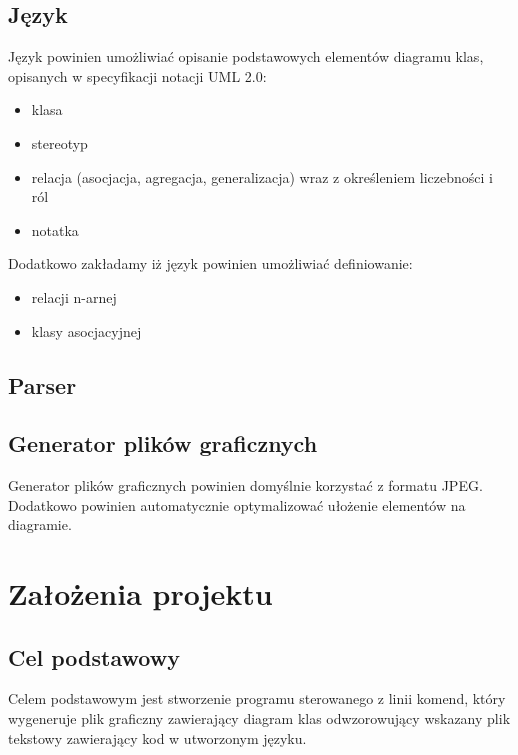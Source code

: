 \documentclass[a4paper,11pt,notitlepage]{article}
\begin{document}
\subsection{Język}
Język powinien umożliwiać opisanie podstawowych elementów diagramu klas, opisanych w specyfikacji notacji UML 2.0:
\begin{itemize}
\item{klasa}
\item{stereotyp}
\item{relacja (asocjacja, agregacja, generalizacja) wraz z określeniem liczebności i ról}
\item{notatka}
\end{itemize}
Dodatkowo zakładamy iż język powinien umożliwiać definiowanie:
\begin{itemize} %
\item{relacji n-arnej}
\item{klasy asocjacyjnej}
\end{itemize}
\subsection{Parser}
\subsection{Generator plików graficznych}
Generator plików graficznych powinien domyślnie korzystać z formatu JPEG. Dodatkowo powinien automatycznie optymalizować ułożenie elementów na diagramie. %
\section{Założenia projektu}
\subsection{Cel podstawowy}
Celem podstawowym jest stworzenie programu sterowanego z linii komend, który wygeneruje plik graficzny zawierający diagram klas odwzorowujący wskazany plik tekstowy zawierający kod w utworzonym języku.
\end{document}
